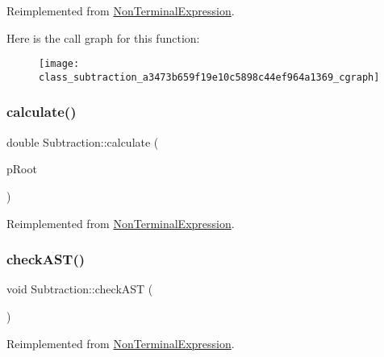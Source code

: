 Reimplemented from \mbox{\hyperlink{class_non_terminal_expression_aa65153b69523e01d86893f6d7b7fc480}{Non\+Terminal\+Expression}}.

Here is the call graph for this function\+:
\nopagebreak
\begin{figure}[H]
\begin{center}
\leavevmode
\texttt{[image: class\_subtraction\_a3473b659f19e10c5898c44ef964a1369\_cgraph]}
\end{center}
\end{figure}
\mbox{\label{class_subtraction_a45931b8ab5514a4517ac2533f50d5235}} 
\subsubsection{\texorpdfstring{calculate()}{calculate()}}
{\footnotesize\ttfamily double Subtraction\+::calculate (\begin{DoxyParamCaption}\item[{std\+::unique\+\_\+ptr$<$ \mbox{\hyperlink{class_abstract_expression}{Abstract\+Expression}} $>$ \&}]{p\+Root }\end{DoxyParamCaption})\hspace{0.3cm}{\ttfamily [virtual]}}



Reimplemented from \mbox{\hyperlink{class_non_terminal_expression_a41f5031f53384915aef5c19a88671afe}{Non\+Terminal\+Expression}}.

\mbox{\label{class_subtraction_a0139d9c18eb7d87fc2f30ca4a6ea114e}} 
\subsubsection{\texorpdfstring{checkAST()}{checkAST()}}
{\footnotesize\ttfamily void Subtraction\+::check\+A\+ST (\begin{DoxyParamCaption}{ }\end{DoxyParamCaption})\hspace{0.3cm}{\ttfamily [virtual]}}



Reimplemented from \mbox{\hyperlink{class_non_terminal_expression_a04d61bbfb066afe1c603396e9e69c397}{Non\+Terminal\+Expression}}.

